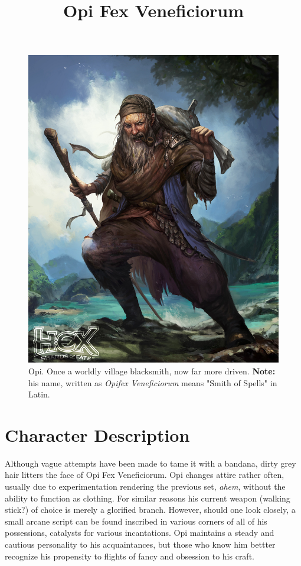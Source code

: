 \documentclass[12pt]{article}
\begin{document}
 
\title{Opi Fex Veneficiorum}
\date{}

\maketitle

\begin{figure}[H]
  \centering
  \includegraphics[width=.8125\textwidth]{./resources/OpiFexVeneficiorum}
  \caption{
    Opi. Once a worldly village blacksmith, now far more driven. {\bf Note:} his name, written as
    {\it Opifex Veneficiorum} means "Smith of Spells" in Latin.
  }
\end{figure}

\section{Character Description}

Although vague attempts have been made to tame it with a bandana, dirty grey hair litters the face
of Opi Fex Veneficiorum. Opi changes attire rather often, usually due to experimentation rendering
the previous set, {\it ahem}, without the ability to function as clothing. For similar reasons his
current weapon (walking stick?) of choice is merely a glorified branch. However, should one look
closely, a small arcane script can be found inscribed in various corners of all of his possessions,
catalysts for various incantations. Opi maintains a steady and cautious personality to his
acquaintances, but those who know him bettter recognize his propensity to flights of fancy and
obsession to his craft. 
\end{document}
